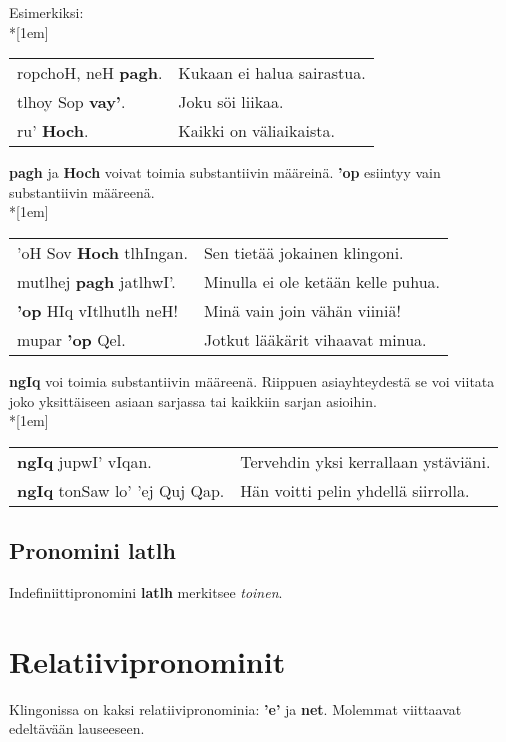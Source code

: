 \documentclass{book}
\begin{document}
Esimerkiksi:\\*[1em]
\begin{tabular}{l l}
    ropchoH, neH \textbf{pagh}. & Kukaan ei halua sairastua. \\
    tlhoy Sop \textbf{vay'}. & Joku söi liikaa. \\
    ru' \textbf{Hoch}. & Kaikki on väliaikaista. \\
\end{tabular}

\textbf{pagh} ja \textbf{Hoch} voivat toimia substantiivin määreinä. \textbf{'op} esiintyy vain substantiivin määreenä.\\*[1em]
\begin{tabular}{l l}
    'oH Sov \textbf{Hoch} tlhIngan. & Sen tietää jokainen klingoni. \\
    mutlhej \textbf{pagh} jatlhwI'. & Minulla ei ole ketään kelle puhua. \\
    \textbf{'op} HIq vItlhutlh neH! & Minä vain join vähän viiniä! \\
    mupar \textbf{'op} Qel. & Jotkut lääkärit vihaavat minua. \\
\end{tabular}

\textbf{ngIq} voi toimia substantiivin määreenä. Riippuen asiayhteydestä se voi viitata joko yksittäiseen asiaan sarjassa tai kaikkiin sarjan asioihin.\\*[1em]
\begin{tabular}{l l}
    \textbf{ngIq} jupwI' vIqan. & Tervehdin yksi kerrallaan ystäviäni. \\
    \textbf{ngIq} tonSaw lo' 'ej Quj Qap. & Hän voitti pelin yhdellä siirrolla. \\
\end{tabular}

\subsection{Pronomini latlh}

Indefiniittipronomini \textbf{latlh} merkitsee \textit{toinen}.

\section{Relatiivipronominit}

Klingonissa on kaksi relatiivipronominia: \textbf{'e'} ja \textbf{net}.
Molemmat viittaavat edeltävään lauseeseen.
\end{document}
